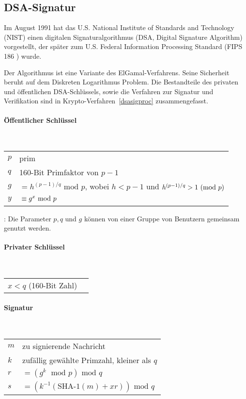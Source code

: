 \begin{refsegment}
\section{DSA-Signatur}

Im August 1991 hat das U.S. National Institute of Standards and Technology
(NIST) einen digitalen Signaturalgorithmus (DSA, Digital Signature
Algorithm) vorgestellt, der später zum U.S. Federal Information Processing
Standard (FIPS 186 \cite{FIPS186}) wurde.

Der Algorithmus ist eine Variante des ElGamal-Verfahrens. Seine Sicherheit
beruht auf dem Diskreten Logarithmus
Problem. Die Bestandteile des privaten
und öffentlichen DSA-Schlüssels, sowie die Verfahren zur Signatur und
Verifikation sind in Krypto-Verfahren~\ref{dsasigproc} zusammengefasst.
\begin{cryptoprocedure}
\paragraph*{Öffentlicher Schlüssel}\strut\\
\begin{tabular}{l@{ }l}
$p$ & prim\\
$q$ & 160-Bit Primfaktor von $p - 1$\\
$g$ & $ = h^{(p-1)/q}  \mbox{ mod } p$, wobei $h < p - 1$ und
$h^{(p-1)/q} > 1  \ (\mbox{mod }p)$\\
$y$ & $\strut \equiv  g^x  \mbox{ mod } p$
\end{tabular}

\begin{remark}{:} Die Parameter $p,q$ und $g$ können von einer Gruppe von
Benutzern gemeinsam genutzt werden.
\end{remark}

\paragraph*{Privater Schlüssel}\strut\\
\begin{tabular}{l@{ }l}
$x < q$ (160-Bit Zahl)
\end{tabular}

\paragraph*{Signatur}\strut\\
\begin{tabular}{l@{ }l}
$m$ & zu signierende Nachricht\\
$k$ & zufällig\index{Zufall} gewählte Primzahl, kleiner als $q$\\
$r$ & $= (g^k \; \mbox{ mod } p) \mbox{ mod } q$\\
$s$ & $= (k^{-1}(\mbox{SHA-1}(m) + xr)) \mbox{ mod } q$
\end{tabular}


\end{cryptoprocedure}
\end{refsegment}
